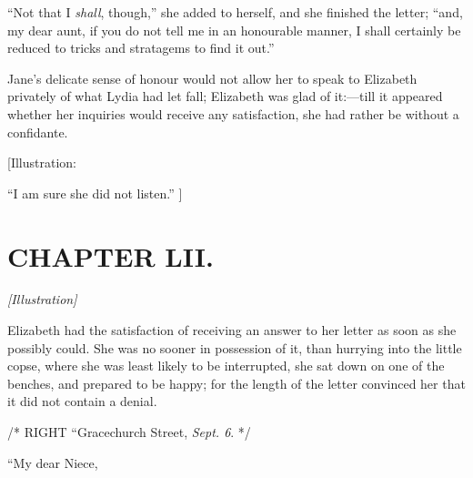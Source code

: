 \documentclass[12pt]{book}
\begin{document}
``Not that I \textit{shall}, though,'' she added to herself, and she finished the letter; ``and, my dear aunt, if you do not tell me in an honourable manner, I shall certainly be reduced to tricks and stratagems to find it out.''

Jane's delicate sense of honour would not allow her to speak to Elizabeth privately of what Lydia had let fall; Elizabeth was glad of it:---till it appeared whether her inquiries would receive any satisfaction, she had rather be without a confidante.

[Illustration:

``I am sure she did not listen.'' ]

\chapter{CHAPTER LII.}

\emph{[Illustration]}

Elizabeth had the satisfaction of receiving an answer to her letter as soon as she possibly could. She was no sooner in possession of it, than hurrying into the little copse, where she was least likely to be interrupted, she sat down on one of the benches, and prepared to be happy; for the length of the letter convinced her that it did not contain a denial.

/* RIGHT ``Gracechurch Street, \textit{Sept. 6}. */

``My dear Niece,
\end{document}
